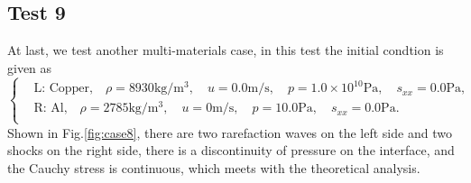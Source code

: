 \documentclass{article}
\numberwithin{equation}{section}
\numberwithin{table}{section}
\begin{document}
\subsection{Test 9}
At last, we test another multi-materials case, in this test the initial condtion is given as
\begin{equation}
 \left\{ \begin{aligned}
	 &	 \text{L: Copper,}\quad  \rho = 8930 \text{kg}/\text{m}^3, \quad  u = 0.0\text{m}/\text{s}, \quad  p = 1.0\times 10^{10}\text{Pa}, \quad  s_{xx}=0.0 \text{Pa},\\
	 &	 \text{R: Al,}\quad  \rho = 2785 \text{kg}/\text{m}^3, \quad  u = 0\text{m}/\text{s}, \quad  p = 10.0 \text{Pa}, \quad  s_{xx}=0.0 \text{Pa}.\\
   \end{aligned}
 \right.
\end{equation}
Shown in Fig.\ref{fig:case8}, there are two rarefaction waves on the left side and two shocks on the right side, there is a discontinuity of pressure on the interface, and the Cauchy stress is continuous, which  meets with the theoretical analysis.
\end{document}
